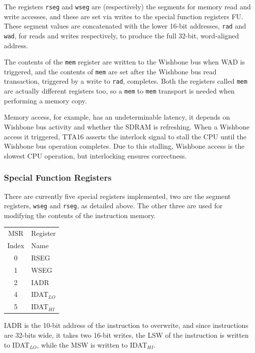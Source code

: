 The registers \texttt{rseg} and \texttt{wseg} are (respectively) the segments for
memory read and write accesses, and these are set via writes to the special
function registers FU. These segment values are concatenated with the lower
16-bit addresses, \texttt{rad} and \texttt{wad}, for reads and writes
respectively, to produce the full 32-bit, word-aligned address.

The contents of the \texttt{mem} register are written to the Wishbone bus when
WAD is triggered, and the contents of \texttt{mem} are set after the Wishbone bus
read transaction, triggered by a write to \texttt{rad}, completes. Both the
registers called \texttt{mem} are actually different registers too, so a
\texttt{mem} to \texttt{mem} transport is needed when performing a memory copy.

Memory access, for example, has an undeterminable latency, it depends on Wishbone
bus activity and whether the SDRAM is refreshing. When a Wishbone access it
triggered, TTA16 asserts the interlock signal to stall the CPU until the Wishbone
bus operation completes. Due to this stalling, Wishbone access is the slowest CPU
operation, but interlocking ensures correctness.


\subsubsection{Special Function Registers}



There are currently five special registers implemented, two are the segment
registers, \texttt{wseg} and \texttt{rseg}, as detailed above. The other three are used for
modifying the contents of the instruction memory.

\begin{center}
\begin{tabular}{c l}
MSR		& Register	\\
Index	& Name	\\
\hline
0	& RSEG	\\
1	& WSEG	\\
2	& IADR	\\
4	& IDAT$_{LO}$	\\
5	& IDAT$_{HI}$	\\
\end{tabular}
\end{center}

IADR is the 10-bit address of the instruction to overwrite, and since
instructions are 32-bits wide, it takes two 16-bit writes, the LSW of the
instruction is written to IDAT$_{LO}$, while the MSW is written to IDAT$_{HI}$.

